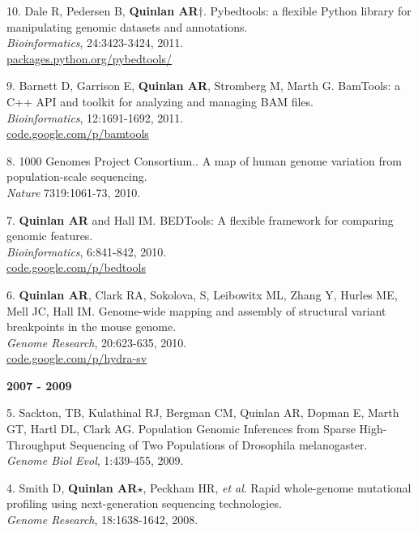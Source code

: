 \documentclass[margin,line]{cv}
\begin{document}
\begin{resume}
\begin{list}{*}{}
    \item[10.] Dale R, Pedersen B, \textbf{Quinlan AR}$\dagger$.
    Pybedtools: a flexible Python library for manipulating genomic datasets and annotations.\\
    \textit{Bioinformatics}, 24:3423-3424, 2011.\\
    \url{packages.python.org/pybedtools/}

    \item[9.] Barnett D, Garrison E, \textbf{Quinlan AR}, Stromberg M, Marth G.
    BamTools: a C++ API and toolkit for analyzing and managing BAM files.\\
    \textit{Bioinformatics}, 12:1691-1692, 2011.\\
    \url{code.google.com/p/bamtools}

    \item[8.] 1000 Genomes Project Consortium..
    A map of human genome variation from population-scale sequencing.\\
    \textit{Nature} 7319:1061-73, 2010.

    \item[7.] \textbf{Quinlan AR} and Hall IM.
    BEDTools: A flexible framework for comparing genomic features.\\
    \textit{Bioinformatics}, 6:841-842, 2010.\\
    \url{code.google.com/p/bedtools}

    \item[6.] \textbf{Quinlan AR}, Clark RA, Sokolova, S, Leibowitx ML, Zhang Y, Hurles ME, Mell JC, Hall IM.
    Genome-wide mapping and assembly of structural variant breakpoints in the mouse genome.\\
    \textit{Genome Research}, 20:623-635, 2010.\\
    \url{code.google.com/p/hydra-sv}

    \end{list}


    \textbf{2007 - 2009} \\
    \begin{list}{*}{}

    \item[5.] Sackton, TB, Kulathinal RJ, Bergman CM, Quinlan AR, Dopman E, Marth GT, Hartl DL, Clark AG.
    Population Genomic Inferences from Sparse High-Throughput Sequencing of Two Populations of Drosophila melanogaster.\\
    \textit{Genome Biol Evol}, 1:439-455, 2009.

    \item[4.] Smith D, \textbf{Quinlan AR}$\star$, Peckham HR, \textit{et al}.
    Rapid whole-genome mutational profiling using next-generation sequencing technologies.\\
    \textit{Genome Research}, 18:1638-1642, 2008.


\end{list}
\end{resume}
\end{document}
